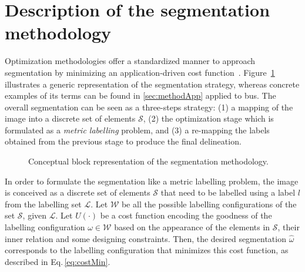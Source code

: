 \graphicspath{ {./content/method/figures/visual_cues/}{./content/method/figures/}}

\section{Description of the segmentation methodology}\label{sec:method}

Optimization methodologies offer a standardized manner to approach segmentation by minimizing an application-driven cost function~\cite{cremers2007review}.
Figure~\ref{fig:method} illustrates a generic representation of the segmentation strategy, whereas concrete examples of its terms can be found in \cref{sec:methodApp} applied to \ac{bus}.
The overall segmentation can be seen as a three-steps strategy: 
(1) a mapping of the image into a discrete set of elements $\mathcal{S}$, 
(2) the optimization stage which is formulated as a \emph{metric labelling} problem, 
and (3) a re-mapping the labels obtained from the previous stage to produce the final delineation. 


\begin{figure}[htpb]
  \footnotesize
  \centering
  
  \caption{Conceptual block representation of the segmentation methodology.}%
  \label{fig:method}
\end{figure}


In order to formulate the segmentation like a metric labelling problem, the image is conceived as a discrete set of elements $\mathcal{S}$ that need to be labelled using a label $l$ from the labelling set $\mathcal{L}$.
Let $\mathcal{W}$ be all the possible labelling configurations of the set $\mathcal{S}$, given $\mathcal{L}$.
Let $U(\cdot)$ be a cost function encoding the goodness of the labelling configuration $\omega \in \mathcal{W}$ based on the appearance of the elements in $\mathcal{S}$, their inner relation and some designing constraints.
Then, the desired segmentation $\hat{\omega}$ corresponds to the labelling configuration that minimizes this cost function, as described in Eq.\,\eqref{eq:costMin}.


